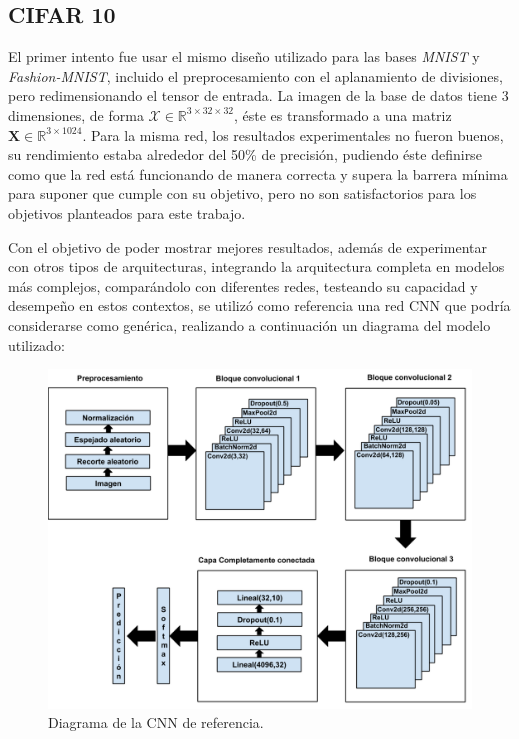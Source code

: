 \documentclass[spanish]{article}
\theoremstyle{definition}
\theoremstyle{remark}
\numberwithin{equation}{section}
\numberwithin{equation}{section} %
\begin{document}
\subsection{CIFAR 10}
El primer intento fue usar el mismo diseño utilizado  para las bases \textit{MNIST} y \textit{Fashion-MNIST}, incluido el preprocesamiento con el aplanamiento de divisiones, pero redimensionando el tensor de entrada. La imagen de la base de datos tiene 3 dimensiones, de forma  $\mathcal{X} \in \mathbb{R}^{3 \times 32 \times 32}$, éste es transformado a una matriz  $\textbf{X} \in \mathbb{R}^{3 \times 1024}$. Para la misma red, los resultados experimentales no fueron buenos, su rendimiento estaba alrededor del 50\% de precisión, pudiendo éste definirse como que la red está funcionando de manera correcta y supera la barrera mínima para suponer que cumple con su objetivo, pero no son satisfactorios para los objetivos planteados para este trabajo.  
\par
Con el objetivo de poder mostrar mejores resultados, además de experimentar con otros tipos de arquitecturas, integrando la arquitectura completa en modelos más complejos, comparándolo con diferentes redes, testeando su capacidad y desempeño en estos contextos, se utilizó como referencia una red CNN que podría considerarse como genérica, realizando a continuación un diagrama del modelo utilizado:
\par
\begin{figure}[H]
\centering
\includegraphics[width=15cm]{img/CNN-Diagram.png}
\caption[Diagrama de la CNN de referencia]{\footnotesize{ Diagrama de la CNN de referencia.   }}
\label{fig:cnn_diagram}
\end{figure}
\end{document}
